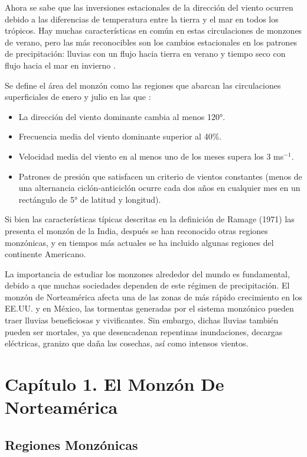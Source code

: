 \documentclass[12pt]{article}
\begin{document}
Ahora se sabe que las inversiones estacionales de la dirección del viento ocurren debido a las diferencias de temperatura entre la tierra y el mar en todos los trópicos. Hay muchas características en común en estas circulaciones de monzones de verano, pero las más reconocibles son los cambios estacionales en los patrones de precipitación: lluvias con un flujo hacia tierra en verano y tiempo seco con flujo hacia el mar en invierno \cite{COMET}.

Se define el área del monzón como las regiones que abarcan las circulaciones superficiales de enero y julio en las que \cite{ramage-1971}:

\begin{itemize}
\item La dirección del viento dominante cambia al menos 120°. 
\item Frecuencia media del viento dominante superior al 40\%.
\item Velocidad media del viento en al menos uno de los meses supera los 3 ms$^{-1}$.
\item Patrones de presión que satisfacen un criterio de vientos constantes (menos de una alternancia ciclón-anticiclón ocurre cada dos años en cualquier mes en un rectángulo de 5° de latitud y longitud).
\end{itemize}

Si bien las características típicas descritas en la definición de Ramage (1971) las presenta el monzón de la India, después  se han reconocido otras regiones monzónicas, y en tiempos más actuales se ha incluido algunas regiones del continente Americano. 

La importancia de estudiar los monzones alrededor del mundo es fundamental, debido a que muchas sociedades dependen de este régimen de precipitación. El monzón de Norteamérica afecta una de las zonas de más rápido crecimiento en los EE.UU. y en México, las tormentas generadas por el sistema monzónico pueden traer lluvias beneficiosas y vivificantes. Sin embargo, dichas lluvias también pueden ser mortales, ya que desencadenan repentinas inundaciones, decargas eléctricas, granizo que daña las cosechas, así como intensos vientos.


\section{Capítulo 1. El Monzón De Norteamérica}

\subsection{Regiones Monzónicas}
\end{document}
